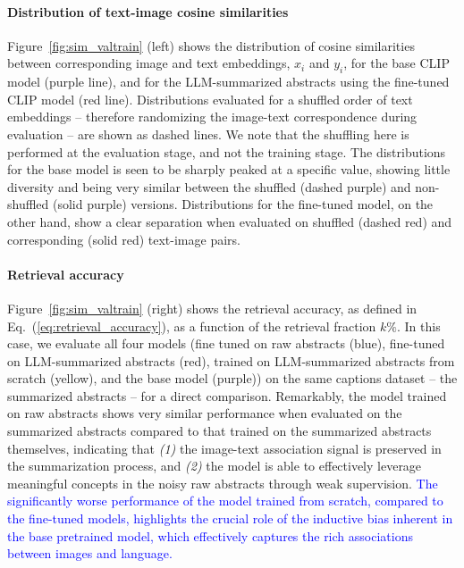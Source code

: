 \documentclass[10pt]{article} %
\newcommand{\eqrefb}[1]{(\ref{#1})}
\newcommand{\changes}[1]{\textcolor{blue}{#1}}
\begin{document}
\paragraph*{Distribution of text-image cosine similarities}

Figure~\ref{fig:sim_valtrain} (left) shows the distribution of cosine similarities between corresponding image and text embeddings, $x_i$ and $y_i$, for the base CLIP model (purple line), and for the LLM-summarized abstracts using the fine-tuned CLIP model (red line).
%
Distributions evaluated for a shuffled order of text embeddings -- therefore randomizing the image-text correspondence during evaluation -- are shown as dashed lines. We note that the shuffling here is performed at the evaluation stage, and not the training stage.
%
The distributions for the base model is seen to be sharply peaked at a specific value, showing little diversity and being very similar between the shuffled (dashed purple) and non-shuffled (solid purple) versions. 
%
Distributions for the fine-tuned model, on the other hand, show a clear separation when evaluated on shuffled (dashed red) and corresponding (solid red) text-image pairs.

\paragraph*{Retrieval accuracy}

Figure~\ref{fig:sim_valtrain} (right) shows the retrieval accuracy, as defined in Eq.~\eqrefb{eq:retrieval_accuracy}, as a function of the retrieval fraction $k\%$.
%
In this case, we evaluate all four models (fine tuned on raw abstracts (blue), fine-tuned on LLM-summarized abstracts (red), trained on LLM-summarized abstracts from scratch (yellow), and the base model (purple)) on the same captions dataset -- the summarized abstracts -- for a direct comparison.
%
Remarkably, the model trained on raw abstracts shows very similar performance when evaluated on the summarized abstracts compared to that trained on the summarized abstracts themselves, indicating that \emph{(1)} the image-text association signal is preserved in the summarization process, and \emph{(2)} the model is able to effectively leverage meaningful concepts in the noisy raw abstracts through weak supervision. \changes{The significantly worse performance of the model trained from scratch, compared to the fine-tuned models, highlights the crucial role of the inductive bias inherent in the base pretrained model, which effectively captures the rich associations between images and language.}
\end{document}
